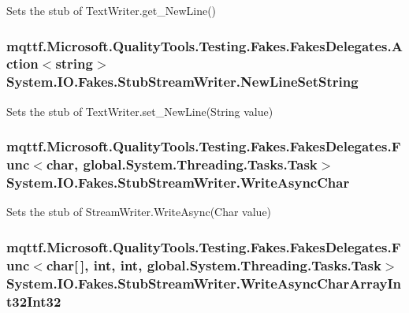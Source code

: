 Sets the stub of Text\-Writer.\-get\-\_\-\-New\-Line()

\hypertarget{class_system_1_1_i_o_1_1_fakes_1_1_stub_stream_writer_aa08d81baeaf110a948fe0472775b65dd}{
\subsubsection[{New\-Line\-Set\-String}]{\setlength{\rightskip}{0pt plus 5cm}mqttf.\-Microsoft.\-Quality\-Tools.\-Testing.\-Fakes.\-Fakes\-Delegates.\-Action$<$string$>$ System.\-I\-O.\-Fakes.\-Stub\-Stream\-Writer.\-New\-Line\-Set\-String}}\label{class_system_1_1_i_o_1_1_fakes_1_1_stub_stream_writer_aa08d81baeaf110a948fe0472775b65dd}


Sets the stub of Text\-Writer.\-set\-\_\-\-New\-Line(\-String value)

\hypertarget{class_system_1_1_i_o_1_1_fakes_1_1_stub_stream_writer_a7fb5a4e4a3d0c9e2ffcdc0c03b8481e0}{
\subsubsection[{Write\-Async\-Char}]{\setlength{\rightskip}{0pt plus 5cm}mqttf.\-Microsoft.\-Quality\-Tools.\-Testing.\-Fakes.\-Fakes\-Delegates.\-Func$<$char, global.\-System.\-Threading.\-Tasks.\-Task$>$ System.\-I\-O.\-Fakes.\-Stub\-Stream\-Writer.\-Write\-Async\-Char}}\label{class_system_1_1_i_o_1_1_fakes_1_1_stub_stream_writer_a7fb5a4e4a3d0c9e2ffcdc0c03b8481e0}


Sets the stub of Stream\-Writer.\-Write\-Async(\-Char value)

\hypertarget{class_system_1_1_i_o_1_1_fakes_1_1_stub_stream_writer_a24fa5b1a4a483f0d352aa65527434e66}{
\subsubsection[{Write\-Async\-Char\-Array\-Int32\-Int32}]{\setlength{\rightskip}{0pt plus 5cm}mqttf.\-Microsoft.\-Quality\-Tools.\-Testing.\-Fakes.\-Fakes\-Delegates.\-Func$<$char\mbox{[}$\,$\mbox{]}, int, int, global.\-System.\-Threading.\-Tasks.\-Task$>$ System.\-I\-O.\-Fakes.\-Stub\-Stream\-Writer.\-Write\-Async\-Char\-Array\-Int32\-Int32}}\label{class_system_1_1_i_o_1_1_fakes_1_1_stub_stream_writer_a24fa5b1a4a483f0d352aa65527434e66}



